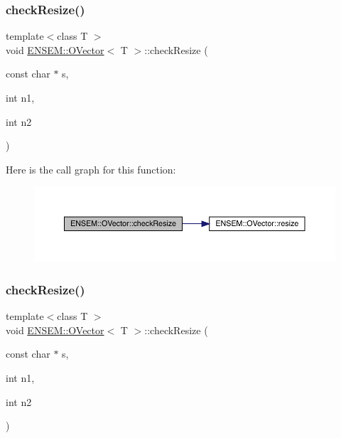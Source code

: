\subsubsection{\texorpdfstring{checkResize()}{checkResize()}\hspace{0.1cm}{\footnotesize\ttfamily [5/9]}}
{\footnotesize\ttfamily template$<$class T $>$ \\
void \mbox{\hyperlink{classENSEM_1_1OVector}{E\+N\+S\+E\+M\+::\+O\+Vector}}$<$ T $>$\+::check\+Resize (\begin{DoxyParamCaption}\item[{const char $\ast$}]{s,  }\item[{int}]{n1,  }\item[{int}]{n2 }\end{DoxyParamCaption})\hspace{0.3cm}{\ttfamily [inline]}}

Here is the call graph for this function\+:
\nopagebreak
\begin{figure}[H]
\begin{center}
\leavevmode
\includegraphics[width=350pt]{d0/d8d/classENSEM_1_1OVector_acd8960fbc5b7df8aabf14ca8ca50f7ab_cgraph}
\end{center}
\end{figure}
\mbox{\label{classENSEM_1_1OVector_acd8960fbc5b7df8aabf14ca8ca50f7ab}} 
\subsubsection{\texorpdfstring{checkResize()}{checkResize()}\hspace{0.1cm}{\footnotesize\ttfamily [6/9]}}
{\footnotesize\ttfamily template$<$class T $>$ \\
void \mbox{\hyperlink{classENSEM_1_1OVector}{E\+N\+S\+E\+M\+::\+O\+Vector}}$<$ T $>$\+::check\+Resize (\begin{DoxyParamCaption}\item[{const char $\ast$}]{s,  }\item[{int}]{n1,  }\item[{int}]{n2 }\end{DoxyParamCaption})\hspace{0.3cm}{\ttfamily [inline]}}

